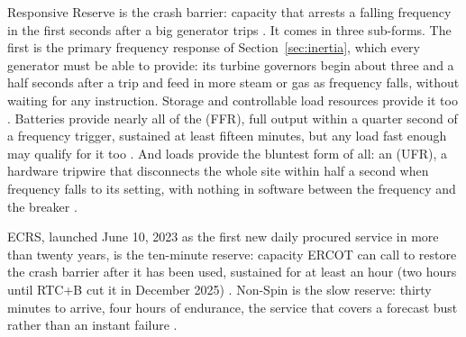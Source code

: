 Responsive Reserve is the crash barrier: capacity that arrests a falling frequency in the first seconds after a big generator trips \autocite{ercot2026protocols}. %
It comes in three sub-forms. The first is the primary frequency response of Section~\ref{sec:inertia}, which every generator must be able to provide: its turbine governors begin about three and a half seconds after a trip and feed in more steam or gas as frequency falls, without waiting for any instruction. Storage and controllable load resources provide it too \autocite{FERCNERCFeb2021,potomac2026somercot}. Batteries provide nearly all of the  (FFR), full output within a quarter second of a frequency trigger, sustained at least fifteen minutes, but any load fast enough may qualify for it too \autocite{ercot2026protocols,potomac2026somercot}. %
And loads provide the bluntest form of all: an  (UFR), a hardware tripwire that disconnects the whole site within half a second when frequency falls to its setting, with nothing in software between the frequency and the breaker \autocite{ercotnog2026}. %

ECRS, launched June 10, 2023 as the first new daily procured service in more than twenty years, is the ten-minute reserve: capacity ERCOT can call to restore the crash barrier after it has been used, sustained for at least an hour (two hours until RTC+B cut it in December 2025) \autocite{ercotecrs2023launch,potomac2023som,ercot2025nprr1282}. %
Non-Spin is the slow reserve: thirty minutes to arrive, four hours of endurance, the service that covers a forecast bust rather than an instant failure \autocite{ercot2026protocols}. %


